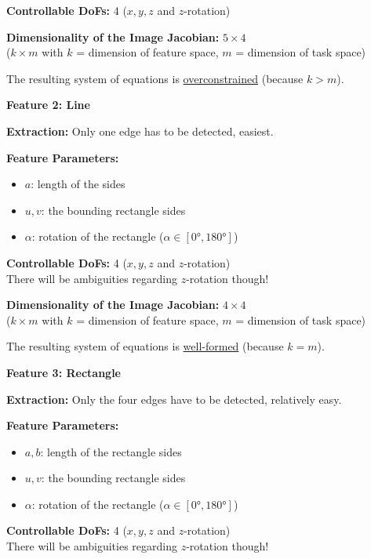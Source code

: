 \documentclass[a4paper,10pt]{article}
\begin{document}
\textbf{Controllable DoFs:} 4 ($x, y, z$ and $z$-rotation) 

\textbf{Dimensionality of the Image Jacobian:} $5 \times 4$\\
($k \times m$ with $k$ = dimension of feature space, $m$ = dimension of task space)

The resulting system of equations is \underline{overconstrained} (because $k > m$).

\vspace{1em}

\textbf{\large Feature 2: Line}
	
\textbf{Extraction:} Only one edge has to be detected, easiest.

\textbf{Feature Parameters:}
\begin{itemize}
 \item $a$: length of the sides
 \item $u, v$: the bounding rectangle sides
 \item $\alpha$: rotation of the rectangle ($\alpha \in [\ang{0}, \ang{180}]$)
\end{itemize}

\textbf{Controllable DoFs:} 4 ($x, y, z$ and $z$-rotation)\\
There will be ambiguities regarding $z$-rotation though!

\textbf{Dimensionality of the Image Jacobian:} $4 \times 4$\\
($k \times m$ with $k$ = dimension of feature space, $m$ = dimension of task space)

The resulting system of equations is \underline{well-formed} (because $k = m$).

\vspace{1em}

\textbf{\large Feature 3: Rectangle}
	
\textbf{Extraction:} Only the four edges have to be detected, relatively easy.

\textbf{Feature Parameters:}
\begin{itemize}
 \item $a, b$: length of the rectangle sides
 \item $u, v$: the bounding rectangle sides
 \item $\alpha$: rotation of the rectangle ($\alpha \in [\ang{0}, \ang{180}]$)
\end{itemize}

\textbf{Controllable DoFs:} 4 ($x, y, z$ and $z$-rotation)\\
There will be ambiguities regarding $z$-rotation though!
\end{document}
